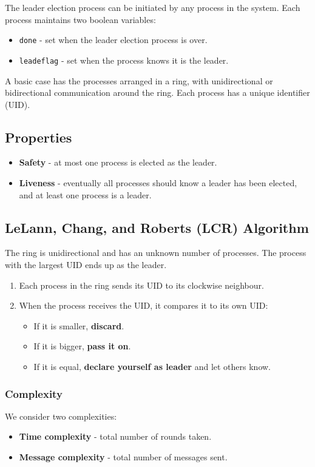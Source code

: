 \documentclass[11pt]{article}
\begin{document}
The leader election process can be initiated by any process in the system.
Each process maintains two boolean variables:
\begin{itemize}
  \item \texttt{done} - set when the leader election process is over.
  \item \texttt{leadeflag} - set when the process knows it is the leader.
\end{itemize}

A basic case has the processes arranged in a ring, with unidirectional or bidirectional communication around the ring.
Each process has a unique identifier (UID).

\subsection{Properties}
\begin{itemize}
  \item \textbf{Safety} - at most one process is elected as the leader.
  \item \textbf{Liveness} - eventually all processes should know a leader has been elected, and at least one process is a leader.
\end{itemize}

\subsection{LeLann, Chang, and Roberts (LCR) Algorithm}
The ring is unidirectional and has an unknown number of processes.
The process with the largest UID ends up as the leader.

\begin{enumerate}
  \item Each process in the ring sends its UID to its clockwise neighbour.
  \item When the process receives the UID, it compares it to its own UID:
    \begin{itemize}
      \item If it is smaller, \textbf{discard}.
      \item If it is bigger, \textbf{pass it on}.
      \item If it is equal, \textbf{declare yourself as leader} and let others know.
    \end{itemize}
\end{enumerate}

\subsubsection{Complexity}
We consider two complexities:
\begin{itemize}
  \item \textbf{Time complexity} - total number of rounds taken.
  \item \textbf{Message complexity} - total number of messages sent.
\end{itemize}
\end{document}
